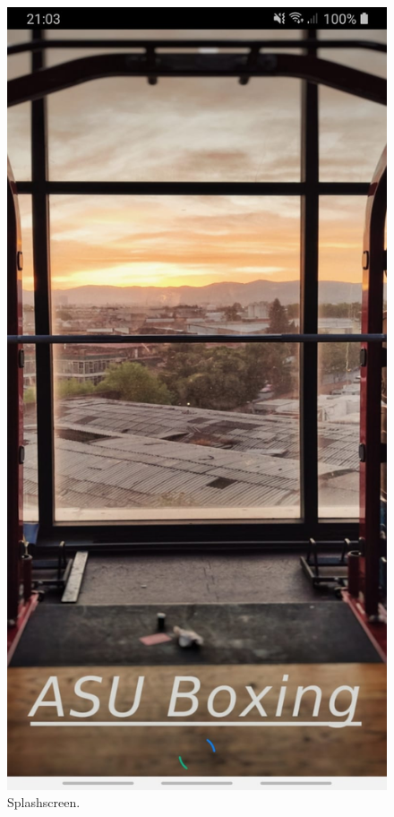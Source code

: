 \documentclass[a4paper,12pt]{report}
\begin{document}
\begin{figure}[ht]
\begin{minipage}[b]{0.5\linewidth}
    \includegraphics[width=.7\linewidth]{images/aplicationImages/splashScreen.jpeg} 
    \caption{Splashscreen.} 
    \vspace{4ex}
  \end{minipage} 
  \begin{minipage}[b]{0.5\linewidth}
    \centering

\end{minipage}
\end{figure}
\end{document}
